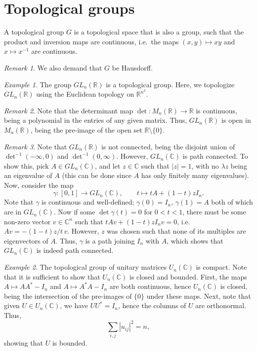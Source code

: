 \documentclass[11pt]{article}
\newcommand{\C}{\mathbb{C}}
\newcommand{\R}{\mathbb{R}}
\theoremstyle{definition}
\theoremstyle{remark}
\newtheorem*{remark}{Remark}
\newtheorem*{example}{Example}
\numberwithin{equation}{section}
\begin{document}
    \section{Topological groups}

    \begin{definition}
        A topological group $G$ is a topological space that is also a group, such
        that the product and inversion maps are continuous, i.e.\ the maps $(x,
        y) \mapsto xy$ and $x \mapsto x^{-1}$ are continuous.
        \begin{remark}
            We also demand that $G$ be Hausdorff.
        \end{remark}
    \end{definition}
    \begin{example}
        The group $GL_n(\R)$ is a topological group. Here, we topologize $GL_n(\R)$
        using the Euclidean topology on $\R^{n^2}$. 
        \begin{remark}
            Note that the determinant map $\det\colon M_n(\R) \to \R$ is continuous,
            being a polynomial in the entries of any given matrix. Thus, $GL_n(\R)$
            is open in $M_n(\R)$, being the pre-image of the open set
            $\R\setminus\{0\}$.
        \end{remark}
        \begin{remark}
            Note that $GL_n(\R)$ is not connected, being the disjoint union of
            $\det^{-1}(-\infty, 0)$ and $\det^{-1}(0, \infty)$. However, $GL_n(\C)$
            is path connected. To show this, pick $A \in GL_n(\C)$, and let $z \in
            \C$ such that $|z| = 1$, with no $\lambda z$ being an eigenvalue of $A$
            (this can be done since $A$ has only finitely many eigenvalues). Now,
            consider the map \[
                \gamma\colon [0, 1] \to GL_n(\C), \qquad t \mapsto tA + (1 - t)zI_n.
            \] Note that $\gamma$ is continuous and well-defined; $\gamma(0) = I_n$,
            $\gamma(1) = A$ both of which are in $GL_n(\C)$. Now if some
            $\det\gamma(t) = 0$ for $0 < t < 1$, there must be some non-zero vector
            $v\in \C^n$ such that $tAv + (1 - t)zI_nv = 0$, i.e.\ $Av = -(1 -
            t)z/t\,v$. However, $z$ was chosen such that none of its multiples are
            eigenvectors of $A$. Thus, $\gamma$ is a path joining $I_n$ with $A$,
            which shows that $GL_n(\C)$ is indeed path connected.
        \end{remark}
    \end{example}
    \begin{example}
        The topological group of unitary matrices $U_n(\C)$ is compact. Note that it
        is sufficient to show that $U_n(\C)$ is closed and bounded. First, the maps
        $A \mapsto A A^* - I_n$ and $A \mapsto A^* A - I_n$ are both continuous,
        hence $U_n(\C)$ is closed, being the intersection of the pre-images of
        $\{0\}$ under these maps. Next, note that given $U \in U_n(\C)$, we have $U
        U^* = I_n$, hence the columns of $U$ are orthonormal. Thus, \[
            \sum_{i, j} |u_{ij}|^2 = n,
        \] showing that $U$ is bounded.
    \end{example}
\end{document}
